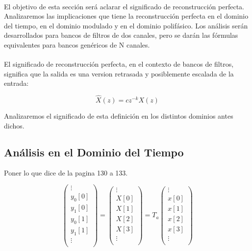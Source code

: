 \paragraph{}
El objetivo de esta sección será aclarar el significado de reconstrucción perfecta. Analizaremos las implicaciones que tiene la reconstrucción perfecta en el dominio del tiempo, en el dominio modulado y en el dominio polifásico. Los análisis serán desarrollados para bancos de filtros de dos canales, pero se darán las fórmulas equivalentes para bancos genéricos de N canales.
\paragraph{}
El significado de reconstrucción perfecta, en el contexto de bancos de filtros, significa que la salida es una version retrasada y posiblemente escalada de la entrada:

\begin{equation}
	\hat{X}(z) = c z^{-k} X(z)
	\label{eq:recons_perf}
\end{equation}

Analizaremos el significado de esta definición en los distintos dominios antes dichos.

\subsection{Análisis en el Dominio del Tiempo}

Poner lo que dice de la pagina 130 a 133.

\begin{equation}
	\begin{pmatrix}
		\vdots \\
		y_0[0] \\
		y_1[0] \\
		y_0[1] \\
		y_1[1] \\
		\vdots \\
	\end{pmatrix}
	=
	\begin{pmatrix}
		\vdots \\
		X[0] \\
		X[1] \\
		X[2] \\
		X[3] \\
		\vdots \\
	\end{pmatrix}
	= T_a 
	\begin{pmatrix}
		\vdots \\
		x[0] \\
		x[1] \\
		x[2] \\
		x[3] \\
		\vdots \\
	\end{pmatrix}
\end{equation}

